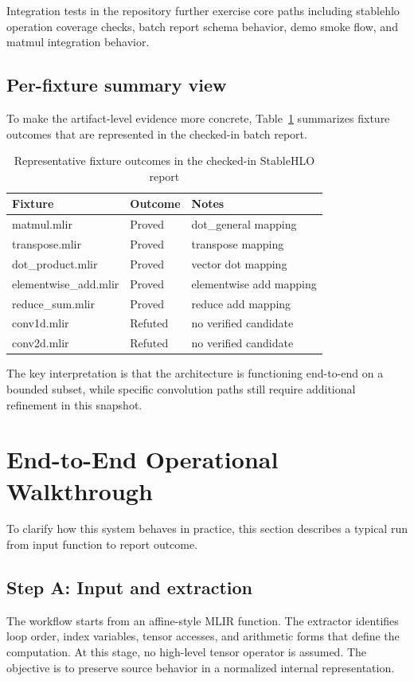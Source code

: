 \documentclass[conference]{IEEEtran}
\begin{document}
Integration tests in the repository further exercise core paths including stablehlo operation coverage checks, batch report schema behavior, demo smoke flow, and matmul integration behavior.

\subsection{Per-fixture summary view}
To make the artifact-level evidence more concrete, Table~\ref{tab:fixture_outcomes} summarizes fixture outcomes that are represented in the checked-in batch report.

\begin{table}[t]
\caption{Representative fixture outcomes in the checked-in StableHLO report}
\label{tab:fixture_outcomes}
\centering
\footnotesize
\begin{tabular}{p{}p{}p{}}
\toprule
Fixture & Outcome & Notes \\
\midrule
matmul.mlir & Proved & dot\_general mapping \\
transpose.mlir & Proved & transpose mapping \\
dot\_product.mlir & Proved & vector dot mapping \\
elementwise\_add.mlir & Proved & elementwise add mapping \\
reduce\_sum.mlir & Proved & reduce add mapping \\
conv1d.mlir & Refuted & no verified candidate \\
conv2d.mlir & Refuted & no verified candidate \\
\bottomrule
\end{tabular}
\end{table}

The key interpretation is that the architecture is functioning end-to-end on a bounded subset, while specific convolution paths still require additional refinement in this snapshot.

\section{End-to-End Operational Walkthrough}
To clarify how this system behaves in practice, this section describes a typical run from input function to report outcome.

\subsection{Step A: Input and extraction}
The workflow starts from an affine-style MLIR function. The extractor identifies loop order, index variables, tensor accesses, and arithmetic forms that define the computation. At this stage, no high-level tensor operator is assumed. The objective is to preserve source behavior in a normalized internal representation.
\end{document}
